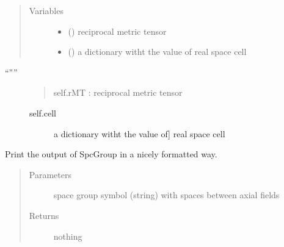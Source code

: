 \documentclass[letterpaper,10pt,english]{sphinxmanual}
\begin{document}
\begin{fulllineitems}
\begin{fulllineitems}
\begin{quote}
\begin{description}
\item[{Variables}] \leavevmode\begin{itemize}
\item {} 
 () \textendash{} reciprocal metric tensor

\item {} 
 () \textendash{} a dictionary witht the value of
real space cell

\end{itemize}

\end{description}\end{quote}
\begin{description}
\item[{“””}] \leavevmode\begin{quote}

self.rMT    : reciprocal metric tensor
\end{quote}
\begin{description}
\item[{self.cell}] \leavevmode{[}a dictionary witht the value of{]}
real space cell

\end{description}

\end{description}

\end{fulllineitems}


\end{fulllineitems}


\begin{fulllineitems}
\label{\detokenize{index:TEMpcPlot.SpaceGroup}}
Print the output of SpcGroup in a nicely formatted way.
\begin{quote}\begin{description}
\item[{Parameters}] \leavevmode
{} \textendash{} space group symbol (string) with spaces between axial fields

\item[{Returns}] \leavevmode
nothing

\end{description}\end{quote}

\end{fulllineitems}
\end{document}

